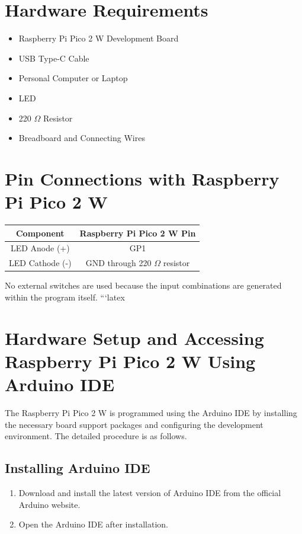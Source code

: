 \documentclass[12pt,a4paper]{article}
\begin{document}
\section{Hardware Requirements}

\begin{itemize}
    \item Raspberry Pi Pico 2 W Development Board
    \item USB Type-C Cable
    \item Personal Computer or Laptop
    \item LED
    \item 220 $\Omega$ Resistor
    \item Breadboard and Connecting Wires
\end{itemize}
\section{Pin Connections with Raspberry Pi Pico 2 W}

\begin{center}
\begin{tabular}{|c|c|}
\hline
\textbf{Component} & \textbf{Raspberry Pi Pico 2 W Pin} \\
\hline
LED Anode (+) & GP1 \\
\hline
LED Cathode (-) & GND through 220 $\Omega$ resistor \\
\hline
\end{tabular}
\end{center}

No external switches are used because the input combinations are generated within the program itself.
```latex
\section{Hardware Setup and Accessing Raspberry Pi Pico 2 W Using Arduino IDE}

The Raspberry Pi Pico 2 W is programmed using the Arduino IDE by installing the necessary board support packages and configuring the development environment. The detailed procedure is as follows.



\subsection{Installing Arduino IDE}

\begin{enumerate}
    \item Download and install the latest version of Arduino IDE from the official Arduino website.
    \item Open the Arduino IDE after installation.
\end{enumerate}
\end{document}
